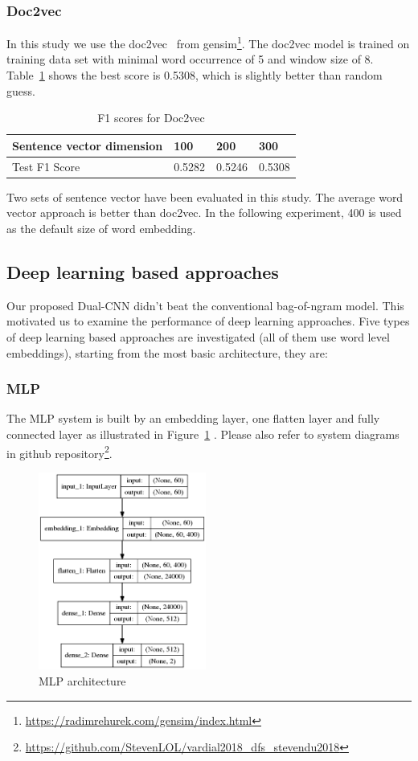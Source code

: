 \documentclass[11pt]{article}
\begin{document}
\subsubsection{Doc2vec}

In this study we use the doc2vec~\cite{Le2014Distributed} from gensim\footnote{\url{https://radimrehurek.com/gensim/index.html}}. The doc2vec model is trained on training data set with minimal word occurrence of 5 and window size of 8. Table~\ref{doc2vec} shows the best score is 0.5308, which is slightly better than random guess.

\begin{table}[h]
	\centering
	
	
	\begin{tabular}{|l|l|l|l|}
		\hline
		Sentence vector dimension & 100 & 200 & 300 \\ \hline
		Test F1 Score & 0.5282 & 0.5246 & 0.5308 \\ \hline
	\end{tabular}
	\caption{F1 scores for Doc2vec}
	\label{doc2vec}
\end{table}




Two sets of sentence vector have been evaluated in this study. The average word vector approach is better than doc2vec. In the following experiment, 400 is used as the default size of word embedding.


\subsection{Deep learning based approaches}

Our proposed Dual-CNN didn’t beat the conventional bag-of-ngram model. This motivated us to examine the performance of deep learning approaches. Five types of deep learning based approaches are investigated (all of them use word level embeddings), starting from the most basic architecture, they are:
\subsubsection{MLP}
The MLP system is built by an embedding layer, one flatten layer and fully connected layer as illustrated in Figure~\ref{fig:mlp} . Please also refer to system diagrams in github repository\footnote{\url{https://github.com/StevenLOL/vardial2018_dfs_stevendu2018}}.
\begin{figure}[h]
	\centering
	\includegraphics[height=6.5cm]{../../images/getMLP.png}
	\caption{MLP architecture} 
	
	\label{fig:mlp} 
\end{figure} 
 
\end{document}
